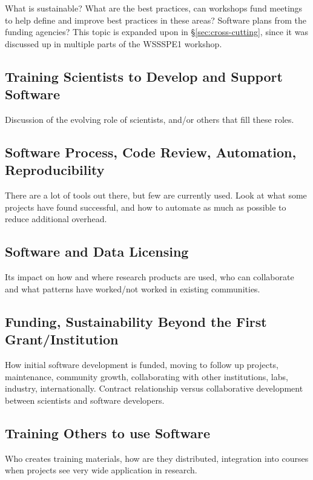 \documentclass[11pt, oneside]{amsart}
\begin{document}
What is sustainable? What are the best practices, can workshops fund
meetings to help define and improve best practices in these areas?
Software plans from the funding agencies? This topic is expanded upon
in \S\ref{sec:cross-cutting}, since it was discussed up in multiple
parts of the WSSSPE1 workshop.

\subsection{Training Scientists to Develop and Support Software}

Discussion of the evolving role of scientists, and/or others that fill
these roles.

\subsection{Software Process, Code Review, Automation, Reproducibility}

There are a lot of tools out there, but few are currently used. Look
at what some projects have found successful, and how to automate as
much as possible to reduce additional overhead.

\subsection{Software and Data Licensing}

Its impact on how and where research products are used, who can
collaborate and what patterns have worked/not worked in existing
communities.

\subsection{Funding, Sustainability Beyond the First Grant/Institution}

How initial software development is funded, moving to follow up
projects, maintenance, community growth, collaborating with other
institutions, labs, industry, internationally. Contract relationship
versus collaborative development between scientists and software
developers.

\subsection{Training Others to use Software}

Who creates training materials, how are they distributed, integration
into courses when projects see very wide application in research.
\end{document}
